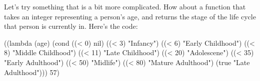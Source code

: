 Let's try something that is a bit more complicated. How about a function that takes an integer representing a person's age, and returns the stage of the life cycle that person is currently in. Here's the code:

\begin{Meruem}
((lambda (age)
   (cond 
     ((< 0) nil)
     ((< 3) "Infancy")
     ((< 6) "Early Childhood")
     ((< 8) "Middle Childhood")
     ((< 11) "Late Childhood")
     ((< 20) "Adolescene")
     ((< 35) "Early Adulthood")
     ((< 50) "Midlife")
     ((< 80) "Mature Adulthood")
     (true "Late Adulthood"))) 57)
\end{Meruem}